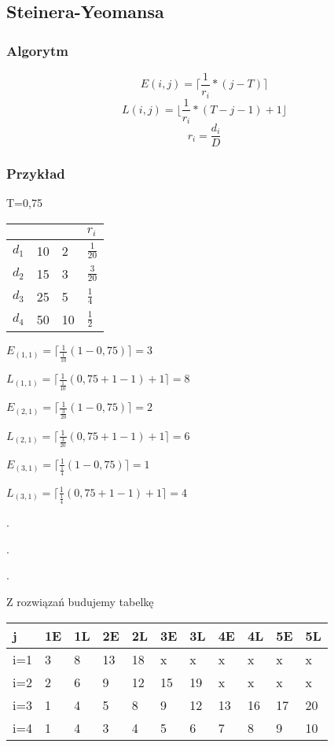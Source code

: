 \documentclass[12pt,a4paper]{article}
\begin{document}
\subsection{Steinera-Yeomansa}
\subsubsection{Algorytm}
\begin{equation}
E(i,j)=\lceil \frac{1}{r_i} * (j-T)\rceil
\end{equation}
\begin{equation}
L(i,j)=\lfloor \frac{1}{r_i} * (T-j-1)+1\rfloor
\end{equation}
\begin{equation}
r_i = \frac{d_i}{D}
\end{equation}
\subsubsection{Przykład}
T=0,75
\begin{center}
    \begin{tabular}{ | l  |l |l|l|}
    \hline
		   &   &  &$r_i$ \\ \hline
    $d_1$  & 10&2& $\frac{1}{20}$\\ \hline
    $d_2$  & 15&3& $\frac{3}{20}$\\ \hline
    $d_3$  & 25&5& $\frac{1}{4}$\\ \hline
    $d_4$  & 50&10& $\frac{1}{2}$\\ \hline
 
    
    \end{tabular}
\end{center}


$E_{(1,1)} = \lceil \frac{1}{\frac{1}{10}}(1-0,75)\rceil = 3$

$L_{(1,1)} = \lceil \frac{1}{\frac{1}{10}}(0,75+1-1)+1\rceil = 8$

$E_{(2,1)} = \lceil \frac{1}{\frac{3}{20}}(1-0,75)\rceil = 2$

$L_{(2,1)} = \lceil \frac{1}{\frac{3}{20}}(0,75+1-1)+1\rceil = 6$

$E_{(3,1)} = \lceil \frac{1}{\frac{1}{4}}(1-0,75)\rceil = 1$

$L_{(3,1)} = \lceil \frac{1}{\frac{1}{4}}(0,75+1-1)+1\rceil = 4$

.

.

.

 Z rozwiązań budujemy tabelkę

\begin{center}
    \begin{tabular}{ |l|l|l|l|l|l|l|l|l|l|l|}
    \hline
		  j &1E&1L&2E&2L&3E&3L&4E&4L&5E&5L\\ \hline
		  i=1&3&8&13&18&x&x&x&x&x&x\\ \hline
		  i=2&2&6&9&12&15&19&x&x&x&x\\ \hline
		  i=3&1&4&5&8&9&12&13&16&17&20\\ \hline		
  		  i=4&1&4&3&4&5&6&7&8&9&10\\ \hline  
    \end{tabular}
\end{center}
\end{document}
